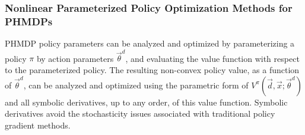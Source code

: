 \subsubsection{Nonlinear Parameterized Policy Optimization Methods for PHMDPs}

PHMDP policy parameters can be analyzed and optimized by parameterizing a policy {\footnotesize $\pi$} by action parameters {\footnotesize $\vec{\theta}^{d}$}, and evaluating the value function with respect to the parameterized policy. The resulting non-convex policy value, as a function of {\footnotesize $\vec{\theta}^{d}$}, can be analyzed and optimized using the parametric form of {\footnotesize $V^{\pi}(\vec{d}, \vec{x}; \vec{\theta}^{d})$} and all symbolic derivatives, up to any order, of this value function. Symbolic derivatives avoid the stochasticity issues associated with traditional policy gradient methods.

